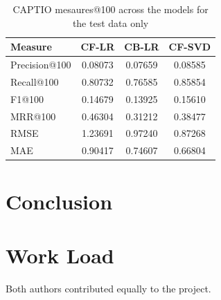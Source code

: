 \documentclass[conference]{IEEEtran}
\begin{document}
\begin{table}[H]
\centering
\caption{CAPTIO mesaures@100 across the models for the test data only}
\label{tab:atk_results_benchamarkpaper}
\begin{tabular}{lccc}
\toprule
\textbf{Measure} & \textbf{CF-LR} & \textbf{CB-LR} & \textbf{CF-SVD} \\
\midrule
Precision@100 & 0.08073 & 0.07659 & 0.08585 \\
Recall@100 & 0.80732 & 0.76585 & 0.85854 \\
F1@100 & 0.14679 & 0.13925 & 0.15610 \\
MRR@100 & 0.46304 & 0.31212 & 0.38477 \\
RMSE & 1.23691 & 0.97240 & 0.87268 \\
MAE & 0.90417 & 0.74607 & 0.66804 \\
\bottomrule
\end{tabular}
\end{table}


\section{Conclusion}


\section*{Work Load}

Both authors contributed equally to the project.






\end{document}
